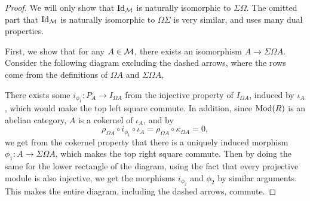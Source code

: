 \begin{proof}
    We will only show that \( \operatorname{Id}_{{\mathcal{M}}} \) is naturally isomorphic to \( \Sigma \Omega \). The omitted part that \( \operatorname{Id}_{{\mathcal{M}}} \) is naturally isomorphic to \( \Omega \Sigma \) is very similar, and uses many dual properties.

    First, we show that for any \( A \in {\mathcal{M}} \), there exists an isomorphism \( A \to \Sigma \Omega A \). Consider the following diagram excluding the dashed arrows, where the rows come from the definitions of \( \Omega A \) and \( \Sigma \Omega A \),
    \begin{center}
    \end{center}
    There exists some \( i_{\phi_1}: P_A \to I_{\Omega A} \) from the injective property of \( I_{\Omega A} \), induced by \( \iota_A \), which would make the top left square commute. In addition, since \( \operatorname{Mod}(R) \) is an abelian category, \( A \) is a cokernel of \( \iota_A \), and by
    \[
        \rho_{\Omega A} \circ i_{\phi_1} \circ \iota_A = \rho_{\Omega A} \circ \kappa_{\Omega A} = 0,
    \]
    we get from the cokernel property that there is a uniquely induced morphism \( \phi_1: A \to \Sigma\Omega A \), which makes the top right square commute. Then by doing the same for the lower rectangle of the diagram, using the fact that every projective module is also injective, we get the morphisms \( i_{\phi_2} \) and \( \phi_2 \) by similar arguments. This makes the entire diagram, including the dashed arrows, commute.


\end{proof}
